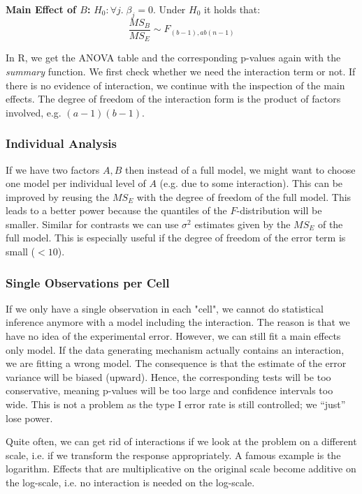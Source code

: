 \textbf{Main Effect of $B$:} $H_0: \forall j. \; \beta_j = 0$. Under $H_0$ it holds that:
$$\frac{MS_{B}}{MS_E} \sim F_{(b-1), ab(n-1)}$$

In R, we get the ANOVA table and the corresponding p-values again with the \textit{summary} function. We first check whether we need the interaction term or not. If there is no evidence of interaction, we continue with the inspection of the main effects. The degree of freedom of the interaction form is the product of factors involved, e.g. $(a-1)(b-1)$.

\subsubsection{Individual Analysis}

If we have two factors $A, B$ then instead of a full model, we might want to choose one model per individual level of $A$ (e.g. due to some interaction). This can be improved by reusing the $MS_E$ with the degree of freedom of the full model. This leads to a better power because the quantiles of the $F$-distribution will be smaller. Similar for contrasts we can use $\sigma^2$ estimates given by the $MS_E$ of the full model. This is especially useful if the degree of freedom of the error term is small ($< 10$).

\subsubsection{Single Observations per Cell}

If we only have a single observation in each "cell", we cannot do statistical inference anymore with a model including the interaction. The reason is that we have no idea of the experimental error. However, we can still fit a main effects only model. If the data generating mechanism actually contains an interaction, we are fitting a wrong model. The consequence is that the estimate of the error variance will be biased (upward). Hence, the corresponding tests will be too conservative, meaning p-values will be too large and confidence intervals too wide. This is not a problem as the type I error rate is still controlled; we “just” lose power. \medskip

Quite often, we can get rid of interactions if we look at the problem on a different scale, i.e. if we transform the response appropriately. A famous example is the logarithm. Effects that are multiplicative on the original scale become additive on the log-scale, i.e. no interaction is needed on the log-scale.\medskip

